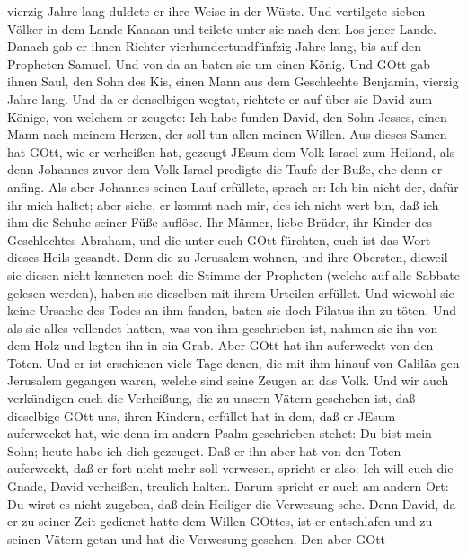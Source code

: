 vierzig Jahre lang duldete er ihre Weise in der Wüste.  Und
vertilgete sieben Völker in dem Lande Kanaan und teilete unter sie nach
dem Los jener Lande.  Danach gab er ihnen Richter
vierhundertundfünfzig Jahre lang, bis auf den Propheten Samuel.
 Und von da an baten sie um einen König. Und GOtt gab ihnen
Saul, den Sohn des Kis, einen Mann aus dem Geschlechte Benjamin, vierzig
Jahre lang.  Und da er denselbigen wegtat, richtete er auf
über sie David zum Könige, von welchem er zeugete: Ich habe funden
David, den Sohn Jesses, einen Mann nach meinem Herzen, der soll tun
allen meinen Willen.  Aus dieses Samen hat GOtt, wie er
verheißen hat, gezeugt JEsum dem Volk Israel zum Heiland, 
als denn Johannes zuvor dem Volk Israel predigte die Taufe der Buße, ehe
denn er anfing.  Als aber Johannes seinen Lauf erfüllete,
sprach er: Ich bin nicht der, dafür ihr mich haltet; aber siehe, er
kommt nach mir, des ich nicht wert bin, daß ich ihm die Schuhe seiner
Füße auflöse.  Ihr Männer, liebe Brüder, ihr Kinder des
Geschlechtes Abraham, und die unter euch GOtt fürchten, euch ist das
Wort dieses Heils gesandt.  Denn die zu Jerusalem wohnen,
und ihre Obersten, dieweil sie diesen nicht kenneten noch die Stimme der
Propheten (welche auf alle Sabbate gelesen werden), haben sie dieselben
mit ihrem Urteilen erfüllet.  Und wiewohl sie keine Ursache
des Todes an ihm fanden, baten sie doch Pilatus ihn zu töten.
 Und als sie alles vollendet hatten, was von ihm
geschrieben ist, nahmen sie ihn von dem Holz und legten ihn in ein Grab.
 Aber GOtt hat ihn auferweckt von den Toten. 
Und er ist erschienen viele Tage denen, die mit ihm hinauf von Galiläa
gen Jerusalem gegangen waren, welche sind seine Zeugen an das Volk.
 Und wir auch verkündigen euch die Verheißung, die zu
unsern Vätern geschehen ist,  daß dieselbige GOtt uns,
ihren Kindern, erfüllet hat in dem, daß er JEsum auferwecket hat, wie
denn im andern Psalm geschrieben stehet: Du bist mein Sohn; heute habe
ich dich gezeuget.  Daß er ihn aber hat von den Toten
auferweckt, daß er fort nicht mehr soll verwesen, spricht er also: Ich
will euch die Gnade, David verheißen, treulich halten. 
Darum spricht er auch am andern Ort: Du wirst es nicht zugeben, daß dein
Heiliger die Verwesung sehe.  Denn David, da er zu seiner
Zeit gedienet hatte dem Willen GOttes, ist er entschlafen und zu seinen
Vätern getan und hat die Verwesung gesehen.  Den aber GOtt
